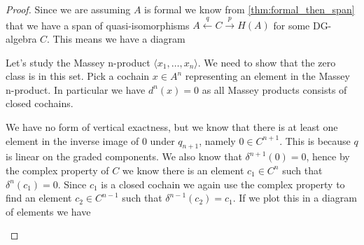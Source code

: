 \iffalse
\begin{proof}
Since we are assuming $A$ is formal we know from \cref{thm:formal_then_span} that we have a span of quasi-isomorphisms $A\overset{q}\longleftarrow C \overset{p}\longrightarrow H(A)$ for some DG-algebra $C$. This means we have a diagram 
\begin{center}
\end{center}

Let's study the Massey n-product $\langle x_1, \ldots , x_n\rangle$. We need to show that the zero class is in this set. Pick a cochain $x\in A^{n}$ representing an element in the Massey n-product. In particular we have $d^{n}(x)=0$ as all Massey products consists of closed cochains. 

We have no form of vertical exactness, but we know that there is at least one element in the inverse image of $0$ under $q_{n+1}$, namely $0\in C^{n+1}$. This is because $q$ is linear on the graded components. We also know that $\delta^{n+1}(0) = 0$, hence by the complex property of $C$ we know there is an element $c_1\in C^n$ such that $\delta^{n}(c_1)=0$. Since $c_1$ is a closed cochain we again use the complex property to find an element $c_2 \in C^{n-1}$ such that $\delta^{n-1}(c_2)=c_1$. If we plot this in a diagram of elements we have 
\begin{center}
\end{center}


\end{proof}
